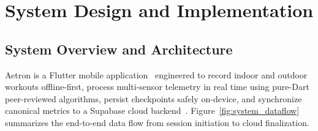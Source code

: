 \chapter{System Design and Implementation}
\label{ch:system_design}

\section{System Overview and Architecture}
\label{sec:system_overview}
Aetron is a Flutter mobile application~\cite{flutter2024framework} engineered to record indoor and outdoor workouts offline-first, process multi-sensor telemetry in real time using pure-Dart peer-reviewed algorithms, persist checkpoints safely on-device, and synchronize canonical metrics to a Supabase cloud backend~\cite{supabase2024backend}. Figure~\ref{fig:system_dataflow} summarizes the end-to-end data flow from session initiation to cloud finalization.

